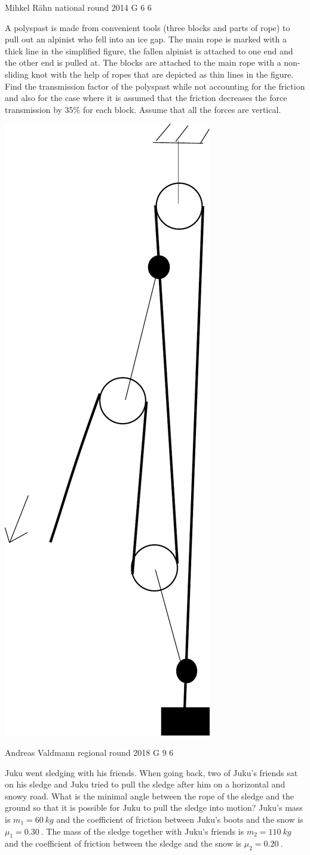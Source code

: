 \documentclass[11pt]{article}
\begin{document}
{Mihkel Rähn} %
{national round} %
{2014} %
{G 6} %
{6} %
{

\ifEngStatement
A polyspast is made from convenient tools (three blocks and parts of rope) to pull out an alpinist who fell into an ice gap. The main rope is marked with a thick line in the simplified figure, the fallen alpinist is attached to one end and the other end is pulled at. The blocks are attached to the main rope with a non-sliding knot with the help of ropes that are depicted as thin lines in the figure. Find the transmission factor of the polyspast while not accounting for the friction and also for the case where it is assumed that the friction decreases the force transmission by $35\percent$ for each block. Assume that all the forces are vertical.
\begin{center}
\includegraphics[width=0.25\linewidth]{2014-v3g-06-Polyspast}
\end{center}
\fi
}

{Andreas Valdmann} %
{regional round} %
{2018} %
{G 9} %
{6} %
{

\ifEngStatement
Juku went sledging with his friends. When going back, two of Juku’s friends sat on his sledge and Juku tried to pull the sledge after him on a horizontal and snowy road. What is the minimal angle between the rope of the sledge and the ground so that it is possible for Juku to pull the sledge into motion? Juku’s mass is $m_1 = \SI{60}{kg}$ and the coefficient of friction between Juku’s boots and the snow is $\mu_1 = \SI{0.30}{}$. The mass of the sledge together with Juku’s friends is $m_2 = \SI{110}{kg}$ and the coefficient of friction between the sledge and the snow is $\mu_2 = \SI{0.20}{}$.
\fi
}
\end{document}
